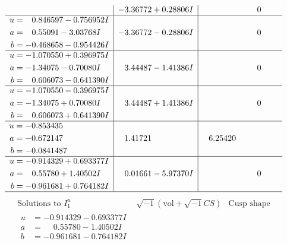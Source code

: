 \documentclass[1p]{elsarticle_modified}
\theoremstyle{definition}
\newcommand{\I}{\sqrt{-1}}
\begin{document}
$$\begin{array}{c|c|c}
 & -3.36772 + 0.28806 I & \phantom{-0.000000 } 0 \\ \hline\begin{aligned}
u &= \phantom{-}0.846597 - 0.756952 I \\
a &= \phantom{-}0.55091 - 3.03768 I \\
b &= -0.468658 - 0.954426 I\end{aligned}
 & -3.36772 - 0.28806 I & \phantom{-0.000000 } 0 \\ \hline\begin{aligned}
u &= -1.070550 + 0.396975 I \\
a &= -1.34075 - 0.70080 I \\
b &= \phantom{-}0.606073 - 0.641390 I\end{aligned}
 & \phantom{-}3.44487 - 1.41386 I & \phantom{-0.000000 } 0 \\ \hline\begin{aligned}
u &= -1.070550 - 0.396975 I \\
a &= -1.34075 + 0.70080 I \\
b &= \phantom{-}0.606073 + 0.641390 I\end{aligned}
 & \phantom{-}3.44487 + 1.41386 I & \phantom{-0.000000 } 0 \\ \hline\begin{aligned}
u &= -0.853435\phantom{ +0.000000I} \\
a &= -0.672147\phantom{ +0.000000I} \\
b &= -0.0841487\phantom{ +0.000000I}\end{aligned}
 & \phantom{-}1.41721\phantom{ +0.000000I} & \phantom{-}6.25420\phantom{ +0.000000I} \\ \hline\begin{aligned}
u &= -0.914329 + 0.693377 I \\
a &= \phantom{-}0.55780 + 1.40502 I \\
b &= -0.961681 + 0.764182 I\end{aligned}
 & \phantom{-}0.01661 - 5.97370 I & \phantom{-0.000000 } 0\\
 \hline 
 \end{array}$$\newpage$$\begin{array}{c|c|c}  
\text{Solutions to }I^u_{1}& \I (\text{vol} + \sqrt{-1}CS) & \text{Cusp shape}\\
 \hline 
\begin{aligned}
u &= -0.914329 - 0.693377 I \\
a &= \phantom{-}0.55780 - 1.40502 I \\
b &= -0.961681 - 0.764182 I\end{aligned}

\end{array}$$
\end{document}
